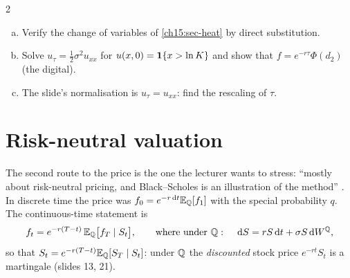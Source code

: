 \begin{paracol}{2}
\begin{exercise}\label{ch15:ex-heat}
\leavevmode
\begin{enumerate}[(a)]
  \item Verify the change of variables of \cref{ch15:sec-heat} by direct substitution.
  \item Solve $u_\tau=\frac12\sigma^2u_{xx}$ for $u(x,0)=\mathbf{1}\{x>\ln K\}$ and show that $f=e^{-r\tau}\Phi(d_2)$ (the digital).
  \item The slide's normalisation is $u_\tau=u_{xx}$: find the rescaling of $\tau$.
\end{enumerate}
\end{exercise}


\section{Risk-neutral valuation}\label{ch15:sec-rn}
The second route to the price is the one the lecturer wants to stress: ``mostly about risk-neutral pricing, and Black--Scholes is an illustration of the method''
. In discrete time the price was $f_0=e^{-r\,\mathrm{d} t}\mathbb{E}_{\mathbb{Q}}[f_1]$ with the special probability $q$. The continuous-time statement is
\begin{equation}\label{ch15:eq-rnval}
  f_t=e^{-r(T-t)}\,\mathbb{E}_{\mathbb{Q}}\bigl[f_T\mid S_t\bigr],\qquad
  \text{where under }\mathbb{Q}:\quad \,\mathrm{d} S=rS\,\mathrm{d} t+\sigma S\,\mathrm{d} W^{\mathbb{Q}},
\end{equation}
so that $S_t=e^{-r(T-t)}\mathbb{E}_{\mathbb{Q}}[S_T\mid S_t]$: under $\mathbb{Q}$ the \emph{discounted} stock price $e^{-rt}S_t$ is a martingale (slides 13, 21).


\end{paracol}
